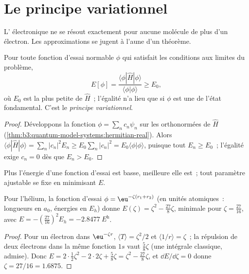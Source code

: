 \section{Le principe variationnel}

L' électronique ne se résout exactement pour
aucune molécule de plus d'un électron. Les approximations se jugent à
l'aune d'un théorème.

\begin{theorem}\label{thm:b3:computational-chemistry:variational}
Pour toute fonction d'essai normable $\phi$ qui satisfait les conditions
aux limites du problème,
\[
E[\phi] = \frac{\langle\phi|\hat H|\phi\rangle}{\langle\phi|\phi\rangle} \ge E_0,
\]
où $E_0$ est la plus petite  de $\hat H$~; l'égalité n'a lieu
que si $\phi$ est une  de l'état fondamental. C'est le
\emph{principe variationnel}.
\end{theorem}

\begin{proof}
Développons la fonction $\phi = \sum_nc_n\psi_n$ sur les  orthonormées de $\hat H$
(\cref{thm:b3:quantum-model-systems:hermitian-real}). Alors $\langle\phi|\hat
H|\phi\rangle = \sum_n|c_n|^2E_n \ge E_0\sum_n|c_n|^2 = E_0\langle\phi|\phi\rangle$,
puisque tout $E_n \ge E_0$~; l'égalité exige $c_n = 0$ dès que $E_n > E_0$.
\end{proof}

Plus l'énergie d'une fonction d'essai est basse, meilleure elle est~;
tout paramètre ajustable se fixe en minimisant $E$.

\begin{proposition}\label{prop:b3:computational-chemistry:helium-zeta}
Pour l'hélium, la fonction d'essai $\phi = \eu^{-\zeta(r_1 + r_2)}$ (en
unités atomiques~: longueurs en $a_0$, énergies en $E_h$) donne
$E(\zeta) = \zeta^2 - \frac{27}{8}\zeta$,
minimale pour $\zeta = \frac{27}{16}$, avec $E = -(\frac{27}{16})^2 E_h =
\qty{-2.8477}{\hartree}$.
\end{proposition}

\begin{proof}
Pour un électron dans $\eu^{-\zeta r}$, $\langle T\rangle = \zeta^2/2$ et
$\langle 1/r\rangle = \zeta$~; la répulsion de deux électrons dans la même
fonction $1s$ vaut $\frac58\zeta$ (une intégrale classique, admise). Donc $E = 2\cdot\frac12
\zeta^2 - 2\cdot2\zeta + \frac58\zeta = \zeta^2 - \frac{27}{8}\zeta$, et $\dd E/\dd
\zeta = 0$ donne $\zeta = 27/16 = 1.6875$.
\end{proof}


